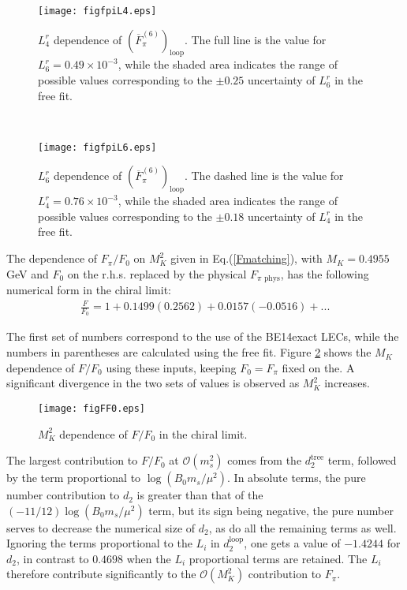 \documentclass[12pt,a4paper]{article}
\begin{document}
\begin{figure}
\begin{minipage}{0.45\textwidth}
\centering
\texttt{[image: figfpiL4.eps]} 
\caption{$L_4^r$ dependence of $(\overline{F}^{(6)}_{\pi} )_{\text{loop}} $. The full line is the value for $L_6^r=0.49 \times 10^{-3}$, while the shaded area indicates the range of possible values corresponding to the $\pm 0.25$ uncertainty of $L^r_6$ in the free fit.}
\label{FigL4Dep}
\end{minipage}
~~
\begin{minipage}{0.45\textwidth}
\texttt{[image: figfpiL6.eps]} 
\caption{$L_6^r$ dependence of $(\overline{F}^{(6)}_{\pi})_{\text{loop}} $. The dashed line is the value for $L_4^r=0.76 \times 10^{-3}$, while the shaded area indicates the range of possible values corresponding to the $\pm 0.18$ uncertainty of $L^r_4$ in the free fit.}
\label{FigL6Dep}
\end{minipage}
\end{figure}

The dependence of $F_{\pi}/F_0$ on $M_K^2$ given in Eq.(\ref{Fmatching}), with $M_K = 0.4955$ GeV and $F_0$ on the r.h.s. replaced by the physical $F_{\pi \text{ phys}}$, has the following numerical form in the chiral limit:
\begin{align}
	\frac{F}{F_0} = 1 + 0.1499(0.2562) + 0.0157(-0.0516) + ... \label{FnumChiral}
\end{align}

The first set of numbers correspond to the use of the BE14exact LECs, while
the numbers in parentheses are calculated using the free fit. Figure \ref{MsvsFpi} shows the $M_K$ dependence of $F/F_0$ using these inputs, keeping $F_0=F_\pi$ fixed on the. A significant divergence in the two sets of values is observed as $M_K^2$ increases.

\begin{figure}
\centering
\texttt{[image: figFF0.eps]}
\caption{$M^2_K$ dependence of $F/F_0$  in the chiral limit.}
\label{MsvsFpi}
\end{figure}

The largest contribution to $F/F_0$ at $\mathcal{O}(m_s^2)$ comes from the $d_2^{\text{tree}}$ term, followed by the term proportional to $\log(B_0 m_s/\mu^2)$. In absolute terms, the pure number contribution to $d_2$ is greater than that of the $(-11/12)\log(B_0 m_s/\mu^2)$ term, but its sign being negative, the pure number serves to decrease the numerical size of $d_2$, as do all the remaining terms as well. Ignoring the terms proportional to the $L_i$ in $d_2^{\textrm{loop}}$, one gets a value of $-1.4244$ for $d_2$, in contrast to $0.4698$ when the $L_i$ proportional terms are retained. The $L_i$
therefore contribute significantly to the $\mathcal{O}(M_K^2)$ contribution to $F_{\pi}$.
\end{document}
